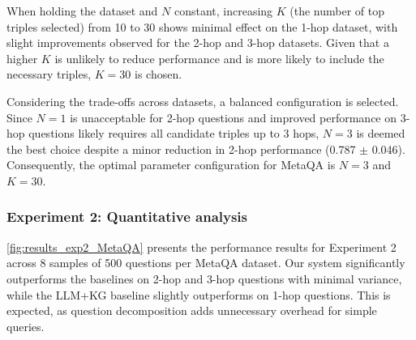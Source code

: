 \documentclass[pdflatex,sn-mathphys-num]{sn-jnl}%
\theoremstyle{thmstyleone}%
\theoremstyle{thmstyletwo}%
\theoremstyle{thmstylethree}%
\begin{document}
When holding the dataset and $N$ constant, increasing $K$ (the number of top triples selected) from 10 to 30 shows minimal effect on the 1-hop dataset, with slight improvements observed for the 2-hop and 3-hop datasets. Given that a higher $K$ is unlikely to reduce performance and is more likely to include the necessary triples, $K=30$ is chosen.

Considering the trade-offs across datasets, a balanced configuration is selected. Since $N=1$ is unacceptable for 2-hop questions and improved performance on 3-hop questions likely requires all candidate triples up to 3 hops, $N=3$ is deemed the best choice despite a minor reduction in 2-hop performance (0.787 $\pm$ 0.046). Consequently, the optimal parameter configuration for MetaQA is $N=3$ and $K=30$.

\subsubsection{Experiment 2: Quantitative analysis}
\label{sec:exp2}
\autoref{fig:results_exp2_MetaQA} presents the performance results for Experiment 2 across 8 samples of 500 questions per MetaQA dataset. Our system significantly outperforms the baselines on 2-hop and 3-hop questions with minimal variance, while the LLM+KG baseline slightly outperforms on 1-hop questions. This is expected, as question decomposition adds unnecessary overhead for simple queries.

\end{document}
